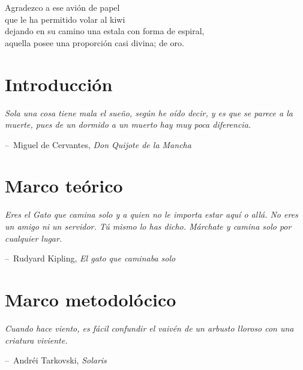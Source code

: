 \documentclass[12pt,letterpaper,titlepage,oneside,openright]{book}
\makeatletter
\newenvironment{chapquote}[2][2em]
  {\setlength{\@tempdima}{#1}%
   \def\chapquote@author{#2}%
   \parshape 1 \@tempdima \dimexpr\textwidth-2\@tempdima\relax%
   \itshape}
  {\par\vspace{.5em}\normalfont\hfill--\ \chapquote@author\hspace*{\@tempdima}\par\bigskip}
\makeatother
\begin{document}
\newpage

\cleardoublepage
{}
{}
\begin{flushleft}
Agradezco a ese avión de papel\\
que le ha permitido volar al kiwi\\
dejando en su camino una estala con forma de espiral,\\
aquella posee una proporción casi divina; de oro.
\end{flushleft}

\newpage

\tableofcontents

\newpage

\mainmatter

\chapter{Introducción}

\begin{chapquote}{Miguel de Cervantes, \textit{Don Quijote de la Mancha}}
Sola una cosa tiene mala el sueño, según he oído decir, y es que se parece a la muerte, pues de un dormido a un muerto hay muy poca diferencia.
\end{chapquote}

\lipsum[1-2]

\chapter{Marco teórico}

\begin{chapquote}{Rudyard Kipling, \textit{El gato que caminaba solo}}
Eres el Gato que camina solo y a quien no le importa estar aquí o allá. No eres un amigo ni
un servidor. Tú mismo lo has dicho. Márchate y camina solo por cualquier lugar.
\end{chapquote}

\lipsum[1-2]

\chapter{Marco metodolócico}

\begin{chapquote}{Andréi Tarkovski, \textit{Solaris}}
Cuando hace viento, es fácil confundir el vaivén de un arbusto lloroso con una criatura viviente.
\end{chapquote}
\end{document}
